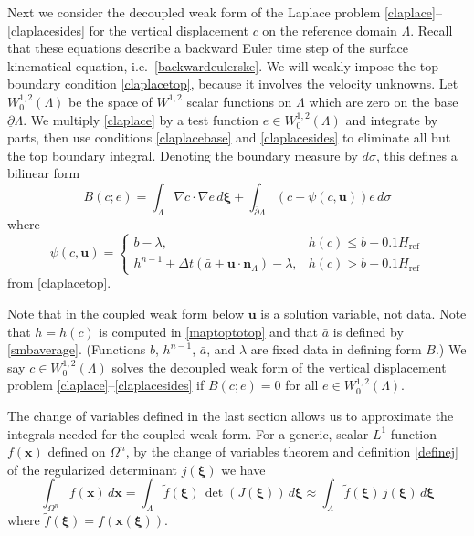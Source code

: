 \documentclass[letterpaper,final,12pt,reqno]{amsart}
\newcommand{\grad}{\nabla}
\newcommand{\bn}{\mathbf{n}}
\newcommand{\bu}{\mathbf{u}}
\newcommand{\bx}{\mathbf{x}}
\newcommand{\bxi}{\bm{\xi}}
\newcommand{\Href}{H_{\text{ref}}}
\begin{document}
Next we consider the decoupled weak form of the Laplace problem \eqref{claplace}--\eqref{claplacesides} for the vertical displacement $c$ on the reference domain $\Lambda$.  Recall that these equations describe a backward Euler time step of the surface kinematical equation, i.e.~\eqref{backwardeulerske}.  We will weakly impose the top boundary condition \eqref{claplacetop}, because it involves the velocity unknowns.  Let $W_0^{1,2}(\Lambda)$ be the space of $W^{1,2}$ scalar functions on $\Lambda$ which are zero on the base $\underline{\partial} \Lambda$.  We multiply \eqref{claplace} by a test function $e \in W_0^{1,2}(\Lambda)$ and integrate by parts, then use conditions \eqref{claplacebase} and \eqref{claplacesides} to eliminate all but the top boundary integral.  Denoting the boundary measure by $d\sigma$, this defines a bilinear form
\begin{equation}
B(c;e) = \int_\Lambda \grad c \cdot \grad e \,d\bxi + \int_{\overline{\partial} \Lambda} (c - \psi(c,\bu)) e\,d\sigma \label{defineB}
\end{equation}
where
\begin{equation}
\psi(c,\bu) = \begin{cases} b-\lambda, & h(c) \le b + 0.1\Href \\
                            h^{n-1} + \Delta t\left(\bar a + \bu \cdot \bn_\Lambda\right) - \lambda, & h(c) >b+0.1\Href \end{cases} \label{definepsi}
\end{equation}
from \eqref{claplacetop}.

Note that in the coupled weak form below $\bu$ is a solution variable, not data.  Note that $h=h(c)$ is computed in \eqref{maptoptotop} and that $\bar a$ is defined by \eqref{smbaverage}.  (Functions $b$, $h^{n-1}$, $\bar a$, and $\lambda$ are fixed data in defining form $B$.)  We say $c \in W_0^{1,2}(\Lambda)$ solves the decoupled weak form of the vertical displacement problem \eqref{claplace}--\eqref{claplacesides} if $B(c;e)=0$ for all $e \in W_0^{1,2}(\Lambda)$.

The change of variables defined in the last section allows us to approximate the integrals needed for the coupled weak form.  For a generic, scalar $L^1$ function $f(\bx)$ defined on $\Omega^n$, by the change of variables theorem and definition \eqref{definej} of the regularized determinant $j(\bxi)$ we have
\begin{equation}
\int_{\Omega^n} f(\bx)\,d\bx = \int_\Lambda \tilde f(\bxi) \, \det(J(\bxi))\,d\bxi \approx \int_\Lambda \tilde f(\bxi) \, j(\bxi)\,d\bxi \label{changeintegral}
\end{equation}
where $\tilde f(\bxi) = f(\bx(\bxi))$.
\end{document}
